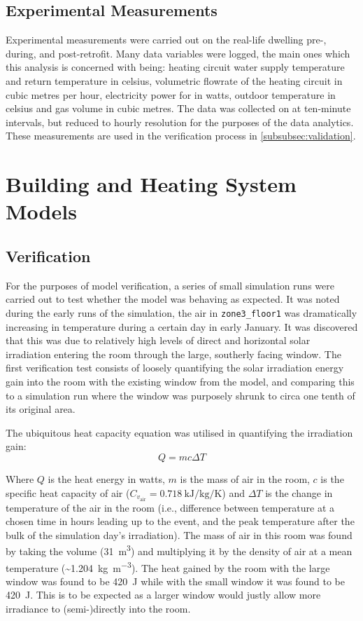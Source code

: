 \subsection{Experimental Measurements} \label{subsec:expmeasure}
Experimental measurements were carried out on the real-life dwelling pre-, during, and post-retrofit. Many data variables were logged, the main ones which this analysis is concerned with being: heating circuit water supply temperature and return temperature in celsius, volumetric flowrate of the heating circuit in cubic metres per hour, electricity power for \HP in watts, outdoor temperature in celsius and gas volume in cubic metres. The data was collected on at ten-minute intervals, but reduced to hourly resolution for the purposes of the data analytics. These measurements are used in the verification process in \cref{subsubsec:validation}.


\section{Building and Heating System Models}



\subsection{Verification} \label{subsubsec:verification}
For the purposes of model verification, a series of small simulation runs were carried out to test whether the model was behaving as expected. It was noted during the early runs of the simulation, the air in \texttt{zone3\_floor1} was dramatically increasing in temperature during a certain day in early January. It was discovered that this was due to relatively high levels of direct and horizontal solar irradiation entering the room through the large, southerly facing window. The first verification test consists of loosely quantifying the solar irradiation energy gain into the room with the existing window from the model, and comparing this to a simulation run where the window was purposely shrunk to circa one tenth of its original area. 

The ubiquitous heat capacity equation was utilised in quantifying the irradiation gain: 
\begin{equation}
    Q = mc\Delta T 
\end{equation} 

Where $Q$ is the heat energy in watts, $m$ is the mass of air in the room, $c$ is the specific heat capacity of air ($C_{v_\text{air}} = \qty{0.718}{\kilo\joule\per\kilo\gram\per\kelvin}$) and $\Delta T$ is the change in temperature of the air in the room (i.e., difference between temperature at a chosen time in hours leading up to the event, and the peak temperature after the bulk of the simulation day's irradiation). The mass of air in this room was found by taking the volume (\qty{31}{\meter\cubed}) and multiplying it by the density of air at a mean temperature (\sim \qty{1.204}{\kilo\gram\per\cubic\meter}). 
The heat gained by the room with the large window was found to be \qty{420}{\joule} while with the small window it was found to be \qty{420}{\joule}. This is to be expected as a larger window would justly allow more irradiance to (semi-)directly into the room. 


